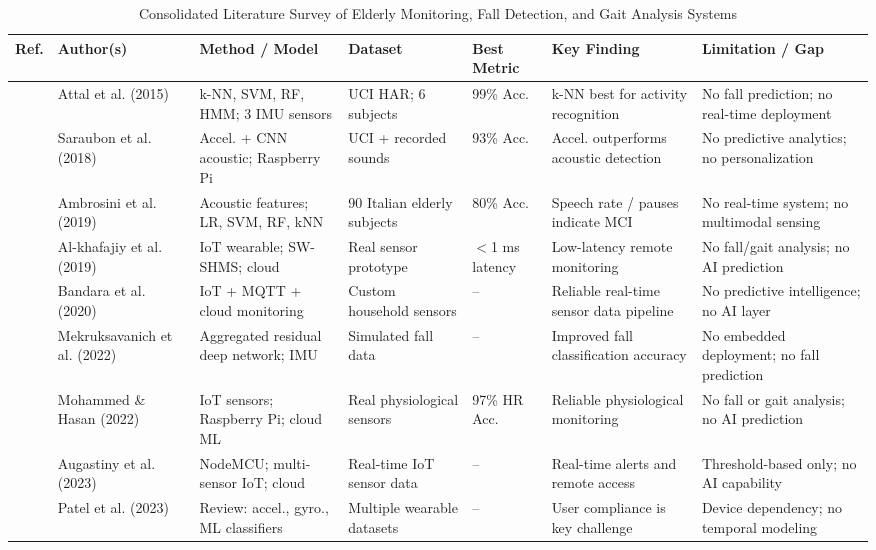\documentclass[conference]{IEEEtran}
\begin{document}
\begin{table}[!t]
\caption{Consolidated Literature Survey of Elderly Monitoring, Fall Detection, and Gait Analysis Systems}
\label{tab:litreview}
\centering
\footnotesize
\begin{tabular}{|p{0.6cm}|p{1.8cm}|p{2.2cm}|p{1.8cm}|p{1.0cm}|p{2.5cm}|p{2.8cm}|}
\hline
\textbf{Ref.} & \textbf{Author(s)} & \textbf{Method / Model} & \textbf{Dataset} & \textbf{Best Metric} & \textbf{Key Finding} & \textbf{Limitation / Gap} \\
\hline
\cite{b3} & Attal et al. (2015) & k-NN, SVM, RF, HMM; 3 IMU sensors & UCI HAR; 6 subjects & 99\% Acc. & k-NN best for activity recognition & No fall prediction; no real-time deployment \\
\hline
\cite{b25} & Saraubon et al. (2018) & Accel. + CNN acoustic; Raspberry Pi & UCI + recorded sounds & 93\% Acc. & Accel. outperforms acoustic detection & No predictive analytics; no personalization \\
\hline
\cite{b27} & Ambrosini et al. (2019) & Acoustic features; LR, SVM, RF, kNN & 90 Italian elderly subjects & 80\% Acc. & Speech rate / pauses indicate MCI & No real-time system; no multimodal sensing \\
\hline
\cite{b11} & Al-khafajiy et al. (2019) & IoT wearable; SW-SHMS; cloud & Real sensor prototype & $<$1 ms latency & Low-latency remote monitoring & No fall/gait analysis; no AI prediction \\
\hline
\cite{b7} & Bandara et al. (2020) & IoT + MQTT + cloud monitoring & Custom household sensors & -- & Reliable real-time sensor data pipeline & No predictive intelligence; no AI layer \\
\hline
\cite{b14} & Mekruksavanich et al. (2022) & Aggregated residual deep network; IMU & Simulated fall data & -- & Improved fall classification accuracy & No embedded deployment; no fall prediction \\
\hline
\cite{b10} & Mohammed \& Hasan (2022) & IoT sensors; Raspberry Pi; cloud ML & Real physiological sensors & 97\% HR Acc. & Reliable physiological monitoring & No fall or gait analysis; no AI prediction \\
\hline
\cite{b23} & Augastiny et al. (2023) & NodeMCU; multi-sensor IoT; cloud & Real-time IoT sensor data & -- & Real-time alerts and remote access & Threshold-based only; no AI capability \\
\hline
\cite{b16} & Patel et al. (2023) & Review: accel., gyro., ML classifiers & Multiple wearable datasets & -- & User compliance is key challenge & Device dependency; no temporal modeling \\

\end{tabular}
\end{table}
\end{document}
